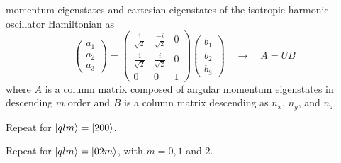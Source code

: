 \documentclass[11pt,letterpaper]{article}
\begin{document}
	momentum eigenstates and cartesian eigenstates of the isotropic harmonic oscillator Hamiltonian as 
	\[
		\begin{pmatrix}a_1\\a_2\\a_3\end{pmatrix} = 
		\begin{pmatrix}\frac{1}{\sqrt 2}&\frac{-i}{\sqrt 2}&0
			\\\frac{1}{\sqrt 2}&\frac{i}{\sqrt 2}&0\\
			0&0&1
		\end{pmatrix}
		\begin{pmatrix}b_1\\b_2\\b_3\end{pmatrix}\quad\to\quad A = UB
	\]
	where $A$ is a column matrix composed of angular momentum eigenstates in descending $m$ order and $B$
	is a column matrix descending as $n_x$, $n_y$, and $n_z$. 
		
	\item
	Repeat for $\ket{qlm} = \ket{200}$.
	
	\item
	Repeat for $\ket{qlm} = \ket{02m}$, with $m=0,1$ and $2$. 
	
	\eenum
\eenum
\end{document}
